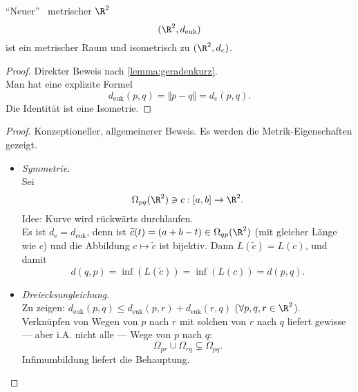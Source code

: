 \begin{theorem}{``Neuer'' \ metrischer $ \R^2 $}
  \begin{equation*}
    (\R^2, d_\text{euk})
  \end{equation*}
  ist ein metrischer Raum und isometrisch zu $ (\R^2, d_e) $.
  \begin{proof}
    Direkter Beweis nach \autoref{lemma:geradenkurz}. \\
    Man hat eine explizite Formel
    \begin{equation*}
      d_{\text{euk}}(p,q) = \Vert p - q \Vert = d_e(p,q)\text{.}
    \end{equation*}
    Die Identität ist eine Isometrie.
  \end{proof}
  \begin{proof}
    Konzeptioneller, allgemeinerer Beweis. Es werden die Metrik-Eigenschaften gezeigt. \\
    \begin{itemize}
      \item \emph{Symmetrie}. \\
        Sei
        \begin{equation*}
          \Omega_{pq}(\R^2) \ni c: [a,b] \to \R^2\text{.}
       \end{equation*}
       Idee: Kurve wird rückwärts durchlaufen. \\
       Es ist $ d_\text{e} = d_\text{euk} $, denn ist $ \widetilde{c}(t) = (a+b-t) \in \Omega_{qp}(\R^2) $ (mit gleicher Länge wie $ c $) und die Abbildung $ c \mapsto \widetilde{c} $ ist bijektiv. Dann $ L(\widetilde{c}) = L(c) $, und damit
       \begin{equation*}
         d(q,p) = \inf(L(\widetilde{c})) = \inf(L(c)) = d(p,q)\text{.}
       \end{equation*}

      \item \emph{Dreiecksungleichung}. \\
        Zu zeigen: $ d_\text{euk}(p,q) \leq d_\text{euk}(p,r) + d_\text{euk}(r,q) $ ($ \forall p, q, r \in \R^2 $). \\
        Verknüpfen von Wegen von $ p $ nach $ r $ mit solchen von $ r $ nach $ q $ liefert gewisse --- aber i.A. nicht alle --- Wege von $ p $ nach $ q $:
        \begin{equation*}
          \Omega_{pr} \cup \Omega_{rq} \subsetneq \Omega_{pq}\text{.}
        \end{equation*}
        Infimumbildung liefert die Behauptung.


\end{itemize}
\end{proof}
\end{theorem}
